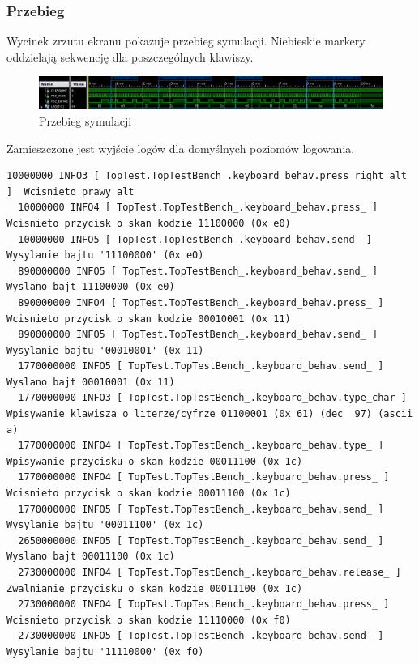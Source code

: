 \documentclass[a4paper,12pt]{article}
\begin{document}
\subsubsection{Przebieg}


Wycinek zrzutu ekranu pokazuje przebieg symulacji. Niebieskie markery oddzielają sekwencję dla poszczególnych klawiszy.
\begin{figure}[htb]
   \centering
   \includegraphics[width=15cm]{grafika/keyboard_sim.png}
   \caption{Przebieg symulacji}
\end{figure}


Zamieszczone jest wyjście logów dla domyślnych poziomów logowania.
\begin{lstlisting}[label=Keyboard_output,caption=Keyboard logs output]
  10000000 INFO3 [ TopTest.TopTestBench_.keyboard_behav.press_right_alt ]  Wcisnieto prawy alt
  10000000 INFO4 [ TopTest.TopTestBench_.keyboard_behav.press_ ]  Wcisnieto przycisk o skan kodzie 11100000 (0x e0)
  10000000 INFO5 [ TopTest.TopTestBench_.keyboard_behav.send_ ]  Wysylanie bajtu '11100000' (0x e0)
  890000000 INFO5 [ TopTest.TopTestBench_.keyboard_behav.send_ ]  Wyslano bajt 11100000 (0x e0)
  890000000 INFO4 [ TopTest.TopTestBench_.keyboard_behav.press_ ]  Wcisnieto przycisk o skan kodzie 00010001 (0x 11)
  890000000 INFO5 [ TopTest.TopTestBench_.keyboard_behav.send_ ]  Wysylanie bajtu '00010001' (0x 11)
  1770000000 INFO5 [ TopTest.TopTestBench_.keyboard_behav.send_ ]  Wyslano bajt 00010001 (0x 11)
  1770000000 INFO3 [ TopTest.TopTestBench_.keyboard_behav.type_char ]  Wpisywanie klawisza o literze/cyfrze 01100001 (0x 61) (dec  97) (ascii a)
  1770000000 INFO4 [ TopTest.TopTestBench_.keyboard_behav.type_ ]  Wpisywanie przycisku o skan kodzie 00011100 (0x 1c)
  1770000000 INFO4 [ TopTest.TopTestBench_.keyboard_behav.press_ ]  Wcisnieto przycisk o skan kodzie 00011100 (0x 1c)
  1770000000 INFO5 [ TopTest.TopTestBench_.keyboard_behav.send_ ]  Wysylanie bajtu '00011100' (0x 1c)
  2650000000 INFO5 [ TopTest.TopTestBench_.keyboard_behav.send_ ]  Wyslano bajt 00011100 (0x 1c)
  2730000000 INFO4 [ TopTest.TopTestBench_.keyboard_behav.release_ ]  Zwalnianie przycisku o skan kodzie 00011100 (0x 1c)
  2730000000 INFO4 [ TopTest.TopTestBench_.keyboard_behav.press_ ]  Wcisnieto przycisk o skan kodzie 11110000 (0x f0)
  2730000000 INFO5 [ TopTest.TopTestBench_.keyboard_behav.send_ ]  Wysylanie bajtu '11110000' (0x f0)

\end{lstlisting}
\end{document}
